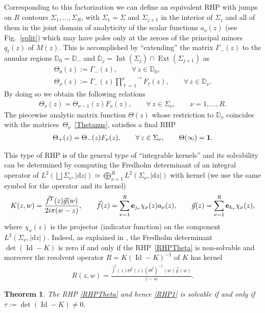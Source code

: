 \documentclass[pdftex]{sigma}
\numberwithin{equation}{section}
\newtheorem{Theorem}{Theorem}[section]
\def\D{\mathbb D}
\def \G{\Gamma}
\def\d{\mathrm d}
\def\1{{\bf 1}}
\begin{document}
Corresponding to this factorization we can def\/ine an equivalent RHP with jumps on $R$ contours $\Sigma_1,\dots, \Sigma_R$, with $\Sigma_1=\Sigma$ and $\Sigma_{j+1}$ in the interior of $\Sigma_j$ and all of them in the joint domain of analyticity of the scalar functions $a_\nu(z)$ (see Fig.~\ref{split}) which may have poles only at the zeroes of the principal minors $q_\ell(z)$ of $M(z)$. This is accomplished by ``extending'' the matrix $\G_-(z)$ to the annular regions $\D_0 = \D_-$ and $ \D_j = \operatorname{Int}(\Sigma_j)\cap \operatorname{Ext}(\Sigma_{j+1})$ as
\begin{gather}
 \Theta_0 (z) :=\G_-(z), \qquad \forall\, z\in \D_0,\nonumber \\
 \Theta_\nu(z) := \G_-(z) \overrightarrow{\prod_{\ell=1}^{\nu} } F_\ell(z) ,\qquad \forall\, z\in \D_\nu.\label{Thetanus}
\end{gather}
By doing so we obtain the following relations
\begin{gather*}
\Theta_{\nu}(z) = \Theta_{\nu-1}(z) F_{\nu}(z) ,\qquad \forall\, z\in \Sigma_{\nu} ,\qquad \nu=1,\dots, R.
\end{gather*}
The piecewise analytic matrix function $\Theta(z)$ whose restriction to $\D_\nu$ coincides with the matri\-ces~$\Theta_\nu$~\eqref{Thetanus}, satisf\/ies a f\/inal RHP
 \begin{gather}\label{RHPTheta}
\Theta_+(z) = \Theta_-(z) F_\nu (z),\qquad \forall\, z\in \Sigma_\nu,\qquad \Theta(\infty)=\1.
\end{gather}

This type of RHP is of the general type of ``integrable kernels'' and its solvability can be determined by computing the Fredholm determinant of an integral operator of $L^2(\bigsqcup \Sigma_\nu, |\d z|) \simeq \bigoplus_{\nu=1}^R L^2(\Sigma_\nu, |\d z|) $ with kernel (we use the same symbol for the operator and its kernel)
\begin{gather}
K(z,w) = \frac {\vec f^T(z) \vec g(w)}{2i\pi(w-z)} ,\qquad\vec f(z) = \sum_{\nu=1}^R {\bf e}_{j_\nu} \chi_\nu(z) a_\nu(z) ,\qquad
\vec g(z) = \sum_{\nu=1}^R {\bf e}_{k_\nu} \chi_\nu(z),\label{K}
\end{gather}
where $\chi_\nu(z)$ is the projector (indicator function) on the component $L^2(\Sigma_\nu, |\d z|)$. Indeed, as explained in \cite{BertolaCafasso1, ItsHarnad, ItsIzerginKorepinSlavnov}, the Fredholm determinant $\det (\operatorname{Id} - K)$ is zero if and only if the RHP~\eqref{RHPTheta} is non-solvable and moreover the resolvent operator $R = K(\operatorname{Id}-K)^{-1}$ of $K$ has kernel
\begin{gather*}
R(z,w) =\frac{ \vec f^t(z) \Theta^t(z) (\Theta^t)^{-1} (w)\vec g(w)}{z-w}.
\end{gather*}
\begin{Theorem}
The RHP \eqref{RHPTheta} and hence \eqref{RHP1} is solvable if and only if $\tau := \det (\operatorname{Id} - K) \neq 0$.
\end{Theorem}
\end{document}
